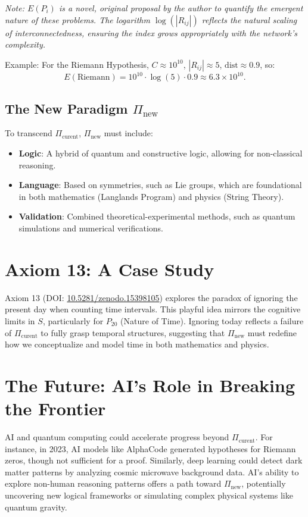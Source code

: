 \documentclass[12pt]{article}
\begin{document}
\vspace{0.2cm}
\textit{Note: \(E(P_i)\) is a novel, original proposal by the author to quantify the emergent nature of these problems. The logarithm \(\log(|R_{ij}|)\) reflects the natural scaling of interconnectedness, ensuring the index grows appropriately with the network’s complexity.}

\vspace{0.2cm}
Example: For the Riemann Hypothesis, \(C \approx 10^{10}\), \(|R_{ij}| \approx 5\), \(\text{dist} \approx 0.9\), so:
\[
E(\text{Riemann}) = 10^{10} \cdot \log(5) \cdot 0.9 \approx 6.3 \times 10^{10}.
\]

\subsection*{The New Paradigm \(\Pi_{\text{new}}\)}
To transcend \(\Pi_{\text{curent}}\), \(\Pi_{\text{new}}\) must include:
\begin{itemize}
  \item \textbf{Logic}: A hybrid of quantum and constructive logic, allowing for non-classical reasoning.
  \item \textbf{Language}: Based on symmetries, such as Lie groups, which are foundational in both mathematics (Langlands Program) and physics (String Theory).
  \item \textbf{Validation}: Combined theoretical-experimental methods, such as quantum simulations and numerical verifications.
\end{itemize}

\section*{Axiom 13: A Case Study}
Axiom 13 (DOI: \href{https://doi.org/10.5281/zenodo.15398105}{10.5281/zenodo.15398105}) explores the paradox of ignoring the present day when counting time intervals. This playful idea mirrors the cognitive limits in \(S\), particularly for \(P_{20}\) (Nature of Time). Ignoring today reflects a failure of \(\Pi_{\text{curent}}\) to fully grasp temporal structures, suggesting that \(\Pi_{\text{new}}\) must redefine how we conceptualize and model time in both mathematics and physics.

\section*{The Future: AI’s Role in Breaking the Frontier}
AI and quantum computing could accelerate progress beyond \(\Pi_{\text{curent}}\). For instance, in 2023, AI models like AlphaCode generated hypotheses for Riemann zeros, though not sufficient for a proof. Similarly, deep learning could detect dark matter patterns by analyzing cosmic microwave background data. AI’s ability to explore non-human reasoning patterns offers a path toward \(\Pi_{\text{new}}\), potentially uncovering new logical frameworks or simulating complex physical systems like quantum gravity.
\end{document}
